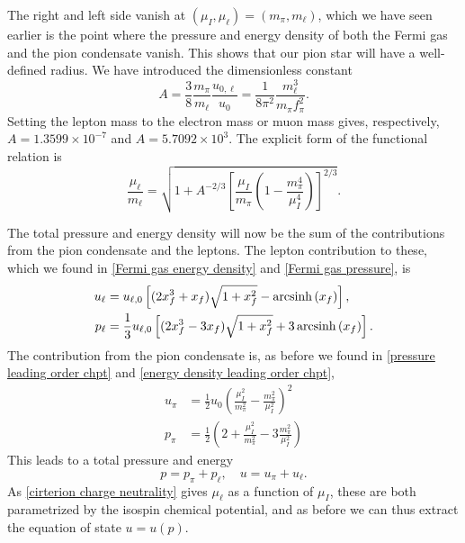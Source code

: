 %
The right and left side vanish at $(\mu_I, \mu_\ell) = (m_\pi, m_\ell)$, which we have seen earlier is the point where the pressure and energy density of both the Fermi gas and the pion condensate vanish.
This shows that our pion star will have a well-defined radius.
We have introduced the dimensionless constant
%
\begin{equation}
    A = \frac{3}{8} \frac{m_\pi} {m_\ell} \frac{u_{0, \ell}}{u_0}
    = \frac{1}{8 \pi^2} \frac{m_\ell^3}{m_\pi f_\pi^2}.
\end{equation}
%
Setting the lepton mass to the electron mass or muon mass gives, respectively, $A = 1.3599 \times10^{- 7}$ and $A = 5.7092 \times 10^{3}$.
The explicit form of the functional relation is
%
\begin{equation}
    \frac{\mu_\ell}{m_\ell}
    =
    \sqrt{
        1 + A^{-2/3}
        \left[
            \frac{\mu_I}{m_\pi}\left( 1 - \frac{m_\pi^4}{\mu_I^4}  \right)
        \right]^{2/3}
    }.
\end{equation}
%

The total pressure and energy density will now be the sum of the contributions from the pion condensate and the leptons.
The lepton contribution to these, which we found in \autoref{Fermi gas energy density} and \autoref{Fermi gas pressure}, is
%
\begin{align}
    u_\ell 
    &= u_{\ell,0} 
    \left[(2x_f^3 + x_f) \sqrt{1 + x_f^2} - \operatorname{arcsinh}\left(x_f\right)\right], \\
    p_\ell
    &=\frac{1}{3} u_{\ell,0}
    \left[(2x_f^3 - 3x_f) \sqrt{1 + x_f^2} + 3\operatorname{arcsinh}\left(x_f\right)\right].
\end{align}
%
The contribution from the pion condensate is, as before we found in \autoref{pressure leading order chpt} and \autoref{energy density leading order chpt},
%
\begin{align}
    u_\pi &= \frac{1}{2} u_0 \left( \frac{\mu_I^2}{m_\pi^2} - \frac{m_\pi^2}{\mu_I^2}\right)^2 \\
p_\pi &= \frac{1}{2} \left( 2 + \frac{\mu_I^2}{m_\pi^2} - 3 \frac{m_\pi^2}{\mu_I^2}  \right)
\end{align}
%
This leads to a total pressure and energy
%
\begin{equation}
    p = p_\pi + p_\ell, \quad u = u_\pi + u_\ell.
\end{equation}
%
As \autoref{cirterion charge neutrality} gives $\mu_\ell$ as a function of $\mu_I$, these are both parametrized by the isospin chemical potential, and as before we can thus extract the equation of state $u = u(p)$.


